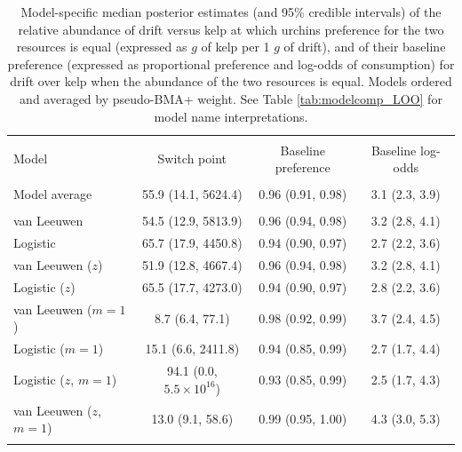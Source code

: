 \begin{table}[!htbp] \centering
  \caption{Model-specific median posterior estimates (and 95\% credible intervals) of the relative abundance of drift versus kelp at which urchins preference for the two resources is equal (expressed as $g$ of kelp per 1 $g$ of drift), and of their baseline preference (expressed as proportional preference and log-odds of consumption) for drift over kelp when the abundance of the two resources is equal.  Models ordered and averaged by pseudo-BMA+ weight.
    See Table \ref{tab:modelcomp_LOO} for model name interpretations.}
  \label{tab:modelcomp_prefs}
\begin{tabular}{@{\extracolsep{5pt}} lccc}
\\[-1.8ex]\hline
\hline \\[-1.8ex]
Model & Switch point & Baseline preference & Baseline log-odds \\
\hline \\[-1.8ex]
Model average & 55.9 (14.1, 5624.4) & 0.96 (0.91, 0.98) & 3.1 (2.3, 3.9) \\
\hline \\[-1.8ex]
van Leeuwen & 54.5 (12.9, 5813.9) & 0.96 (0.94, 0.98) & 3.2 (2.8, 4.1) \\
Logistic & 65.7 (17.9, 4450.8) & 0.94 (0.90, 0.97) & 2.7 (2.2, 3.6) \\
van Leeuwen ($z$) & 51.9 (12.8, 4667.4) & 0.96 (0.94, 0.98) & 3.2 (2.8, 4.1) \\
Logistic ($z$) & 65.5 (17.7, 4273.0) & 0.94 (0.90, 0.97) & 2.8 (2.2, 3.6) \\
van Leeuwen ($m=1$) & 8.7 (6.4, 77.1) & 0.98 (0.92, 0.99) & 3.7 (2.4, 4.5) \\
Logistic ($m=1$) & 15.1 (6.6, 2411.8) & 0.94 (0.85, 0.99) & 2.7 (1.7, 4.4) \\
Logistic ($z$, $m=1$) & 94.1 (0.0, $5.5 \times 10^{16}$) & 0.93 (0.85, 0.99) & 2.5 (1.7, 4.3) \\
van Leeuwen ($z$, $m=1$) & 13.0 (9.1, 58.6) & 0.99 (0.95, 1.00) & 4.3 (3.0, 5.3) \\
\hline \\[-1.8ex]
\end{tabular}
\end{table}
